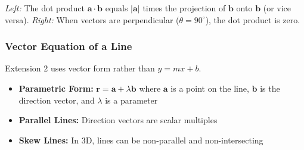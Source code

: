 \documentclass[12pt]{article}
\begin{document}
\vspace{0.5em}
\noindent\textit{Left:} The dot product $\mathbf{a} \cdot \mathbf{b}$ equals $|\mathbf{a}|$ times the projection of $\mathbf{b}$ onto $\mathbf{b}$ (or vice versa).
\textit{Right:} When vectors are perpendicular ($\theta = 90^\circ$), the dot product is zero.

\subsubsection{Vector Equation of a Line}
Extension 2 uses vector form rather than $y=mx+b$.
\begin{itemize}[leftmargin=*]
  \item \textbf{Parametric Form:} $\mathbf{r} = \mathbf{a} + \lambda\mathbf{b}$ where $\mathbf{a}$ is a point on the line, $\mathbf{b}$ is the direction vector, and $\lambda$ is a parameter
  \item \textbf{Parallel Lines:} Direction vectors are scalar multiples
  \item \textbf{Skew Lines:} In 3D, lines can be non-parallel and non-intersecting
\end{itemize}
\end{document}
